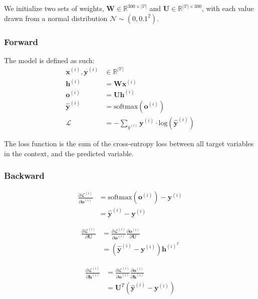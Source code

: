 \documentclass{article}
\numberwithin{equation}{section}
\begin{document}
We initialize two sets of weights, $\bm{W} \in \mathbb{R}^{300 \times |\mathcal{V}|}$ and $\bm{U} \in \mathbb{R}^{|\mathcal{V}| \times 300}$, with each value drawn from a normal distribution $\mathcal{N} \sim (0, 0.1^2)$.\\

\subsubsection{Forward}
The model is defined as such:
\begin{equation}
\begin{split}
	\bm{x}^{(i)}, \bm{y}^{(i)} &\in \mathbb{R}^{|\mathcal{V}|} \\
	\bm{h}^{(i)} &= \bm{W} \bm{x}^{(i)} \\
	\bm{o}^{(i)} &= \bm{U} \bm{h}^{(i)} \\
 	\hat{\bm{y}}^{(i)} &= \text{softmax}(\bm{o}^{(i)}) \\
	\mathcal{L} &= -\sum_{y^{(i)}} \bm{y}^{(i)} \cdot \text{log}(\hat{\bm{y}}^{(i)})
\end{split}
\end{equation}

The loss function is the sum of the cross-entropy loss between all target variables in the context, and the predicted variable.

\subsubsection{Backward}
\begin{equation}
\begin{split}
\frac{\partial \mathcal{L}^{(i)}}{\partial \bm{o}^{(i)}}
	&= \text{softmax}(\bm{o}^{(i)}) - \bm{y}^{(i)} \\
	&= \hat{\bm{y}}^{(i)} - \bm{y}^{(i)}
\end{split}
\end{equation}

\begin{equation}
\begin{split}
\frac{\partial \mathcal{L}^{(i)}}{\partial \bm{U}}
	&= \frac{\partial \mathcal{L}^{(i)}}{\partial \bm{o}^{(i)}} \frac{\partial \bm{o}^{(i)}}{\partial \bm{U}} \\
	&= (\hat{\bm{y}}^{(i)} - \bm{y}^{(i)}) \bm{h}^{(i)^T}
\end{split}
\end{equation}

\begin{equation}
\begin{split}
\frac{\partial \mathcal{L}^{(i)}}{\partial \bm{h}^{(i)}}
	&= \frac{\partial \mathcal{L}^{(i)}}{\partial \bm{o}^{(i)}} \frac{\partial \bm{o}^{(i)}}{\partial \bm{h}^{(i)}} \\
	&= \bm{U}^T(\hat{\bm{y}}^{(i)} - \bm{y}^{(i)})
\end{split}
\end{equation}
\end{document}
